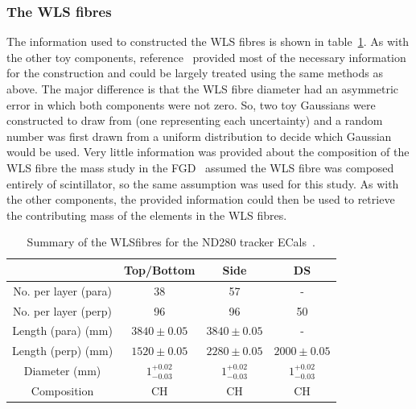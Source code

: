 \subsubsection{The WLS fibres}
\label{subsubsec:ECalMassWLSFibres}
The information used to constructed the WLS fibres is shown in table~\ref{table:WLSFibreDimensions}.  As with the other toy components, reference~\cite{1748-0221-8-10-P10019} provided most of the necessary information for the construction and could be largely treated using the same methods as above.  The major difference is that the WLS fibre diameter had an asymmetric error in which both components were not zero.  So, two toy Gaussians were constructed to draw from (one representing each uncertainty) and a random number was first drawn from a uniform distribution to decide which Gaussian would be used.  Very little information was provided about the composition of the WLS fibre the mass study in the FGD~\cite{FGDMassTN} assumed the WLS fibre was composed entirely of scintillator, so the same assumption was used for this study.  As with the other components, the provided information could then be used to retrieve the contributing mass of the elements in the WLS fibres.
\begin{table}
  \begin{tabular}{ c c c c }
     & Top/Bottom & Side & DS \\ \hline \hline
  No. per layer (para) & 38 & 57 & - \\
  No. per layer (perp) & 96 & 96 & 50 \\
  Length (para) (mm) & $3840\pm0.05$ & $3840\pm0.05$ & - \\
  Length (perp) (mm) & $1520\pm0.05$ & $2280\pm0.05$ & $2000\pm0.05$ \\
  Diameter (mm) & $1^{+0.02}_{-0.03}$ & $1^{+0.02}_{-0.03}$ & $1^{+0.02}_{-0.03}$\\
  Composition & CH & CH & CH \\

  \end{tabular}
  \caption{Summary of the WLSfibres for the ND280 tracker ECals~\cite{1748-0221-8-10-P10019}.}
  \label{table:WLSFibreDimensions}
\end{table}


